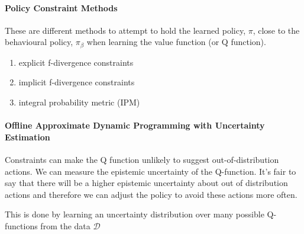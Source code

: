 \documentclass{article}
\begin{document}
\paragraph{Policy Constraint Methods}
These are different methods to attempt to hold the learned policy, \(\pi\), close to the behavioural policy, \(\pi_{\beta}\) when learning the value function (or Q function).
\begin{enumerate}
  \item explicit f-divergence constraints
  \item implicit f-divergence constraints
  \item integral probability metric (IPM)
\end{enumerate}

\paragraph{Offline Approximate Dynamic Programming with Uncertainty Estimation} Constraints can make the Q function unlikely to suggest out-of-distribution actions. We can measure the epistemic uncertainty of the Q-function. It's fair to say that there will be a higher epistemic uncertainty about out of distribution actions and therefore we can adjust the policy to avoid these actions more often.




This is done by learning an uncertainty distribution over many possible Q-functions from the data \(\mathcal{D}\)
\end{document}
